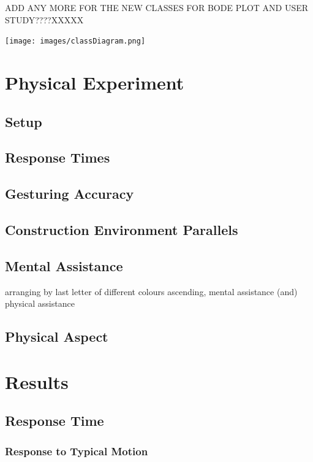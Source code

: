 \documentclass[11pt]{article}
\begin{document}
ADD ANY MORE FOR THE NEW CLASSES FOR BODE PLOT AND USER STUDY????XXXXX

\begin{landscape}

\begin{center}
\texttt{[image: images/classDiagram.png]}
\label{figure:classDiagram}
\end{center}


\end{landscape}



\section{Physical Experiment}
\subsection{Setup}
\subsection{Response Times}
\subsection{Gesturing Accuracy}
\subsection{Construction Environment Parallels}
\subsection{Mental Assistance}
arranging by last letter of different colours ascending, mental assistance (and) physical assistance
\subsection{Physical Aspect}

\section{Results}
\subsection{Response Time}
\subsubsection{Response to Typical Motion}
\end{document}
